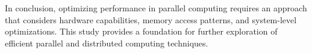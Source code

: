 \documentclass[journal]{./IEEE/IEEEtran}
\begin{document}
In conclusion, optimizing performance in parallel computing requires an approach that considers hardware capabilities, memory access patterns, and system-level optimizations. This study provides a foundation for further exploration of efficient parallel and distributed computing techniques.








\end{document}
